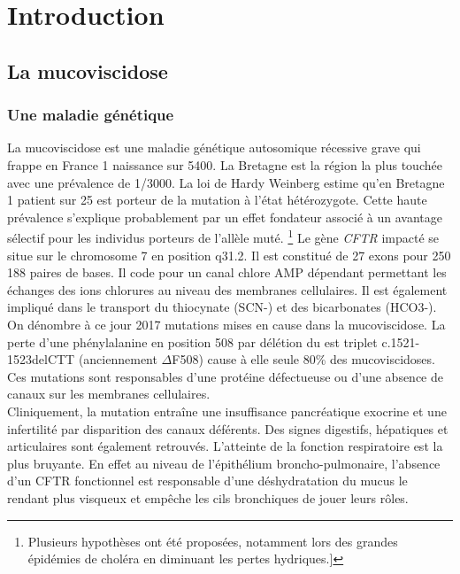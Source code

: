 \documentclass[12pt,a4paper]{article}
\begin{document}
\newpage

\setcounter{page}{1}

\section{Introduction}
\subsection{La mucoviscidose}
\subsubsection{Une maladie génétique}
La mucoviscidose est une maladie génétique autosomique récessive grave qui frappe en France 1 naissance sur 5400\cite{Registredelamuco.org}. La Bretagne est la région la plus touchée avec une prévalence de 1/3000\cite{Registredelamuco.org}.
La loi de Hardy Weinberg estime qu’en Bretagne 1 patient sur 25 est porteur de la mutation à l’état hétérozygote. Cette haute prévalence s’explique probablement par un effet fondateur associé à un avantage sélectif pour les individus porteurs de l’allèle muté. \footnote{Plusieurs hypothèses ont été proposées, notamment lors des grandes épidémies de choléra en diminuant les pertes hydriques.]} 
Le gène \textit{CFTR} impacté se situe sur le chromosome 7 en position q31.2. Il est constitué de 27 exons pour 250 188\cite{OLeary2016} paires de bases. Il code pour un canal chlore AMP dépendant permettant les échanges des ions chlorures au niveau des membranes cellulaires. Il est également impliqué dans le transport du thiocynate (SCN-) et des bicarbonates (HCO3-)\cite{Quinton2001}. 
On dénombre à ce jour 2017 mutations \cite{cftrdb} mises en cause dans la mucoviscidose. La perte d’une phénylalanine en position 508 par délétion du est triplet c.1521-1523delCTT (anciennement $\Delta$F508) cause à elle seule 80\% des mucoviscidoses\cite{cftrdb}.
Ces mutations sont responsables d’une protéine défectueuse ou d’une absence de canaux sur les membranes cellulaires. \\
Cliniquement, la mutation entraîne une insuffisance pancréatique exocrine et une infertilité par disparition des canaux déférents. Des signes digestifs, hépatiques et articulaires sont également retrouvés.
L'atteinte de la fonction respiratoire est la plus bruyante. En effet au niveau de l’épithélium broncho-pulmonaire, l’absence d’un CFTR fonctionnel est responsable d’une déshydratation du mucus le rendant plus visqueux et empêche les cils bronchiques de jouer leurs rôles.\\
\end{document}
